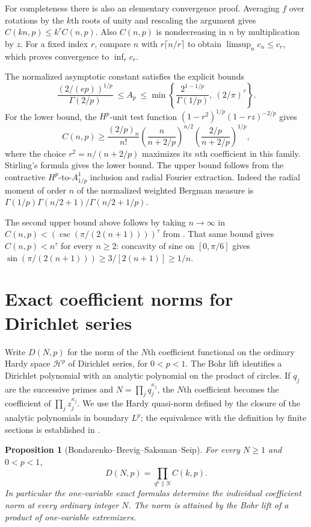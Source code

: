 \documentclass[11pt]{article}
\newtheorem{proposition}[theorem]{Proposition}
\begin{document}
For completeness there is also an elementary convergence proof.
Averaging \(f\) over rotations by the \(k\)th roots of unity and
rescaling the argument gives
\(C(kn,p)\leq k^\tau C(n,p)\). Also \(C(n,p)\) is nondecreasing
in \(n\) by multiplication by \(z\). For a fixed index \(r\),
compare \(n\) with \(r\lceil n/r\rceil\) to obtain
\(\limsup_n c_n\leq c_r\), which proves convergence to
\(\inf_r c_r\).

The normalized asymptotic constant satisfies the explicit bounds
\[
 \frac{(2/(ep))^{1/p}}{\Gamma(2/p)}
 \ \leq A_p\ \leq\min\left\{\frac{2^{1-1/p}}{\Gamma(1/p)},\ (2/\pi)^\tau\right\}.
\]
For the lower bound, the \(H^p\)-unit test function
\((1-r^2)^{1/p}(1-rz)^{-2/p}\) gives
\[
 C(n,p)\geq \frac{(2/p)_n}{n!}
  \left(\frac{n}{n+2/p}\right)^{n/2}
  \left(\frac{2/p}{n+2/p}\right)^{1/p},
\]
where the choice \(r^2=n/(n+2/p)\) maximizes its \(n\)th
coefficient in this family. Stirling's formula gives the lower
bound. The upper bound follows from the contractive
\(H^p\)-to-\(A^1_{1/p}\) inclusion and radial Fourier extraction.
Indeed the radial moment of order \(n\) of the normalized
weighted Bergman measure is
\(\Gamma(1/p)\Gamma(n/2+1)/\Gamma(n/2+1/p)\).

The second upper bound above follows by taking \(n\to\infty\)
in \(C(n,p)<(\csc(\pi/(2(n+1))))^\tau\) from \cite{General}.
That same bound gives \(C(n,p)<n^\tau\) for every \(n\ge2\):
concavity of sine on \([0,\pi/6]\) gives
\(\sin(\pi/(2(n+1)))\ge3/[2(n+1)]\ge1/n\).

\section{Exact coefficient norms for Dirichlet series}
\label{sec:dirichlet}

Write \(D(N,p)\) for the norm of the \(N\)th coefficient
functional on the ordinary Hardy space \(\mathcal H^p\) of
Dirichlet series, for \(0<p<1\). The Bohr lift identifies a
Dirichlet polynomial with an analytic polynomial on the product
of circles. If \(q_j\) are the successive primes and
\(N=\prod_j q_j^{\kappa_j}\), the \(N\)th coefficient becomes
the coefficient of \(\prod_j z_j^{\kappa_j}\). We use the
Hardy quasi-norm defined by the closure of the analytic
polynomials in boundary \(L^p\); the equivalence with the
definition by finite sections is established in
\cite[Section~2]{BBSS}.

\begin{proposition}[Bondarenko--Brevig--Saksman--Seip]
\label{prop:dirichlet-product}
For every \(N\geq1\) and \(0<p<1\),
\[
 D(N,p)=\prod_{q^k\parallel N} C(k,p).
\]
In particular the one-variable exact formulas determine the
individual coefficient norm at every ordinary integer \(N\).
The norm is attained by the Bohr lift of a product of
one-variable extremizers.
\end{proposition}
\end{document}
